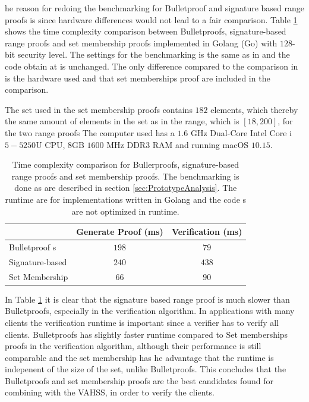 he reason for redoing the benchmarking for Bulletproof and signature based range proofs is since hardware differences would not lead to a fair comparison. Table \ref{tab:runtime} shows the time complexity comparison between Bulletproofs, signature-based range proofs and set membership proofs implemented in Golang (Go) with $128$- bit security level.  The settings for the benchmarking is the same as in \cite{RANGE-SET}  and the code obtain at \cite{Git:RP} is unchanged. The only difference compared to the comparison in \cite{RANGE-SET} is the hardware used and that set memberships proof are included in the comparison. 

The set used in the set membership proofs contains $182$ elements, which thereby the same amount of elements in the set as in the range, which is $[18,200]$, for the two range proofs 
The computer used has a $1.6$ GHz Dual-Core Intel Core i$5-5250$U CPU, $8$GB $1600$ MHz DDR3 RAM  and running macOS $10.15$. 



\begin{table}
	\centering
	\caption{Time complexity comparison for Bullerproofs, signature-based range proofs and set membership proofs. The benchmarking is done as  are described in section \ref{sec:PrototypeAnalysis}. The runtime are for implementations written in Golang and the code s are not optimized in runtime. }
	\label{tab:runtime}
	\begin{tabular}[t]{ l c c }
			 \toprule
    									 		&Generate Proof (ms)	&		Verification  (ms)\\ \midrule		
  			Bulletproof s  				&   $ 198$   & $ 79$ 	\\
    			Signature-based 		&   $ 240 $   				&	$438$  \\
    			Set Membership 		&		$66$				&	$90$	\\
			\bottomrule		
	\end{tabular}
 \end{table}

 In Table \ref{tab:runtime} it is clear that the signature based range proof is much slower than Bulletproofs, especially  in the verification algorithm. In  applications with many clients the verification runtime  is important since a verifier has to verify all clients. Bulletproofs has slightly faster runtime compared to Set memberships proofs in the verification algorithm, although their performance is still comparable and the set membership has he advantage that the runtime is indepenent of the size of the set, unlike Bulletproofs. This concludes that the Bulletproofs and set membership proofs are the best candidates found for combining with the VAHSS, in order  to verify the clients.
	
